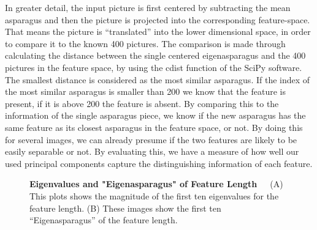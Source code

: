 In greater detail, the input picture is first centered by subtracting the mean asparagus and then the picture is projected into the corresponding feature-space. That means the picture is “translated” into the lower dimensional space, in order to compare it to the known 400 pictures. The comparison is made through calculating the distance between the single centered eigenasparagus and the 400 pictures in the feature space, by using the cdist function of the SciPy software. The smallest distance is considered as the most similar asparagus. If the index of the most similar asparagus is smaller than 200 we know that the feature is present, if it is above 200 the feature is absent. By comparing this to the information of the single asparagus piece, we know if the new asparagus has the same feature as its closest asparagus in the feature space, or not. By doing this for several images, we can already presume if the two features are likely to be easily separable or not. By evaluating this, we have a measure of how well our used principal components capture the distinguishing information of each feature.\\

\begin{figure}
    \centering
    \qquad
    \caption[First ten Eigenvalues and "Eigenasparagus" of Feature Length]{\textbf{Eigenvalues and "Eigenasparagus" of Feature Length}~~~(A) This plots shows the magnitude of the first ten eigenvalues for the feature length. (B) These images show the first ten “Eigenasparagus” of the feature length.}
    \label{fig:PCAlength}
\end{figure}

